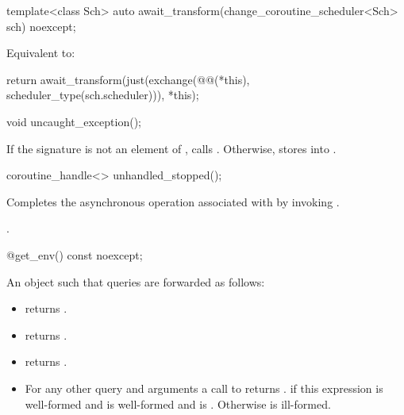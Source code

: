 %
\begin{itemdecl}
template<class Sch>
  auto await_transform(change_coroutine_scheduler<Sch> sch) noexcept;
\end{itemdecl}
\begin{itemdescr}
\pnum
\effects
Equivalent to:
\begin{codeblock}
return await_transform(just(exchange(@@(*this), scheduler_type(sch.scheduler))), *this);
\end{codeblock}
\end{itemdescr}

%
\begin{itemdecl}
void uncaught_exception();
\end{itemdecl}
\begin{itemdescr}
\pnum
\effects
If the signature  is not an element
of , calls .
Otherwise, stores  into .
\end{itemdescr}

%
\begin{itemdecl}
coroutine_handle<> unhandled_stopped();
\end{itemdecl}
\begin{itemdescr}
\pnum
\effects
Completes the asynchronous operation associated with 
by invoking .
\end{itemdescr}
\begin{itemdescr}
\pnum
\returns
{}.
\end{itemdescr}

%
\begin{itemdecl}
@\unspec@ get_env() const noexcept;
\end{itemdecl}
\begin{itemdescr}
\pnum
\returns
An object  such that queries are forwarded as follows:
\begin{itemize}
\item {} returns .
\item {} returns .
\item {} returns .
\item For any other query  and arguments  a
call to  returns
.  if this expression
is well-formed and  is well-formed and is .
Otherwise  is ill-formed.
\end{itemize}
\end{itemdescr}


